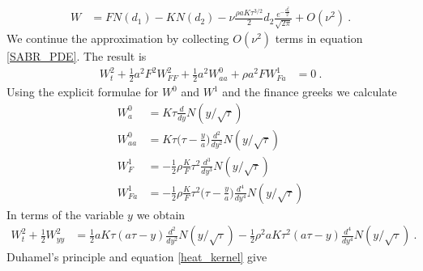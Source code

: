 \documentclass[10pt]{article}
\numberwithin{equation}{section}
\begin{document}
\begin{equation*}
	\begin{split}
	W&=FN(d_1)-KN(d_2)-\nu \frac{\rho a K \tau^{3/2}}{2} d_2 \frac{e^{-\frac{d_2^2}{2}} }{\sqrt{2\pi}} +O(\nu^2)\:.
	\end{split}
\end{equation*}
We continue the approximation by collecting $O(\nu^2)$ terms in equation \eqref{SABR_PDE}. The result is
\begin{equation*}
	\begin{split}
	W^{2}_{t} +\frac{1}{2} a^2 F^2 W^{2}_{FF}+\frac{1}{2} a^2 W^{0}_{aa}+\rho a^2 F W^{1}_{Fa}&=0\:.
	\end{split}
\end{equation*}
Using the explicit formulae for $W^{0}$ and $W^{1}$ and the finance greeks we calculate
\begin{equation*}
	\begin{split}
	  W_{a}^{0} &= K\tau \frac{d}{dy} N(y/\sqrt{\tau})\\
	  W_{aa}^{0} &= K\tau\biggl( \tau - \frac{y}{a}\biggr) \frac{d^2}{d y^2} N(y/\sqrt{\tau})\\
	  W_{F}^{1} &= -\frac{1}{2}\rho \frac{K}{F} \tau^2 \frac{d^3}{dy^3}N(y/\sqrt{\tau})\\
	    W_{Fa}^{1} &= -\frac{1}{2}\rho \frac{K}{F} \tau^2 \biggl(\tau-\frac{y}{a}\biggr) \frac{d^4}{dy^4}N(y/\sqrt{\tau})
	\end{split}
\end{equation*}
In terms of the variable $y$ we obtain
\begin{equation*}
	\begin{split}
	W^{2}_{t} +\frac{1}{2} W^{2}_{yy} &= \frac{1}{2}aK\tau ( a\tau - y ) \frac{d^2}{d y^2} N(y/\sqrt{\tau}) -\frac{1}{2}\rho^2 a K \tau^2 (a\tau-y ) \frac{d^4}{dy^4}N(y/\sqrt{\tau})\:.
	\end{split}
\end{equation*}
Duhamel's principle and equation \eqref{heat_kernel} give
\end{document}

